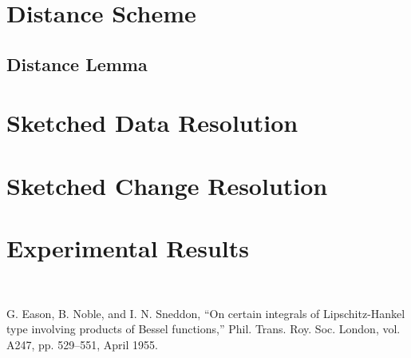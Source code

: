 \documentclass[10pt, conference]{IEEEtran}
\begin{document}
\section{Distance Scheme}

\subsection{Distance Lemma}

\section{Sketched Data Resolution}

\section{Sketched Change Resolution}

\section{Experimental Results}

\ 

\begin{thebibliography}{00}
 G. Eason, B. Noble, and I. N. Sneddon, ``On certain integrals of Lipschitz-Hankel type involving products of Bessel functions,'' Phil. Trans. Roy. Soc. London, vol. A247, pp. 529--551, April 1955.
\end{thebibliography}
\end{document}
